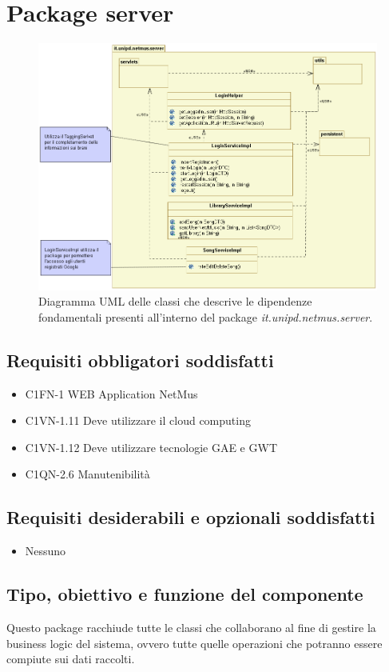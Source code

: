 \newpage
\section{Package server}

\begin{figure}[!h]
  \centering
  \includegraphics[width=15cm]{img/DP/classes_server.png}
\caption{Diagramma UML delle classi che descrive le dipendenze
fondamentali presenti all'interno del package
\emph{it.unipd.netmus.server}.}
\end{figure}


\subsection*{Requisiti obbligatori soddisfatti}
\begin{itemize}
	\item C1FN-1 WEB Application NetMus
	\item C1VN-1.11 Deve utilizzare il cloud computing
	\item C1VN-1.12 Deve utilizzare tecnologie GAE e GWT
	\item C1QN-2.6 Manutenibilit\`a
\end{itemize}
\subsection*{Requisiti desiderabili e opzionali soddisfatti}
\begin{itemize}
    \item Nessuno
\end{itemize}
\subsection*{Tipo, obiettivo e funzione del componente} %
Questo package racchiude tutte le classi che collaborano al fine di gestire la
business logic del sistema, ovvero tutte quelle operazioni che potranno essere
compiute sui dati raccolti.
